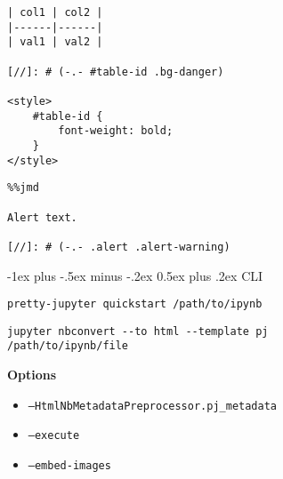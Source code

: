 \documentclass[10pt,landscape]{article}
\makeatletter
\renewcommand{\section}{\@startsection{section}{1}{0mm}%
                                {-1ex plus -.5ex minus -.2ex}%
                                {0.5ex plus .2ex}%
                                {\normalfont\large\bfseries}}
\makeatother
\begin{document}
\begin{multicols}{3}
\begin{lstlisting}
| col1 | col2 |
|------|------|
| val1 | val2 |

[//]: # (-.- #table-id .bg-danger)

<style>
    #table-id {
        font-weight: bold;
    }
</style>
\end{lstlisting}

\begin{lstlisting}
%%jmd

Alert text.

[//]: # (-.- .alert .alert-warning)
\end{lstlisting}

\section{CLI}

\begin{lstlisting}
pretty-jupyter quickstart /path/to/ipynb
\end{lstlisting}

\begin{lstlisting}
jupyter nbconvert --to html --template pj
/path/to/ipynb/file
\end{lstlisting}

\textbf{Options}
\begin{itemize}
    \item \texttt{--HtmlNbMetadataPreprocessor.pj\_metadata}
    \item \texttt{--execute}
    \item \texttt{--embed-images}
\end{itemize}



\end{multicols}
\end{document}
